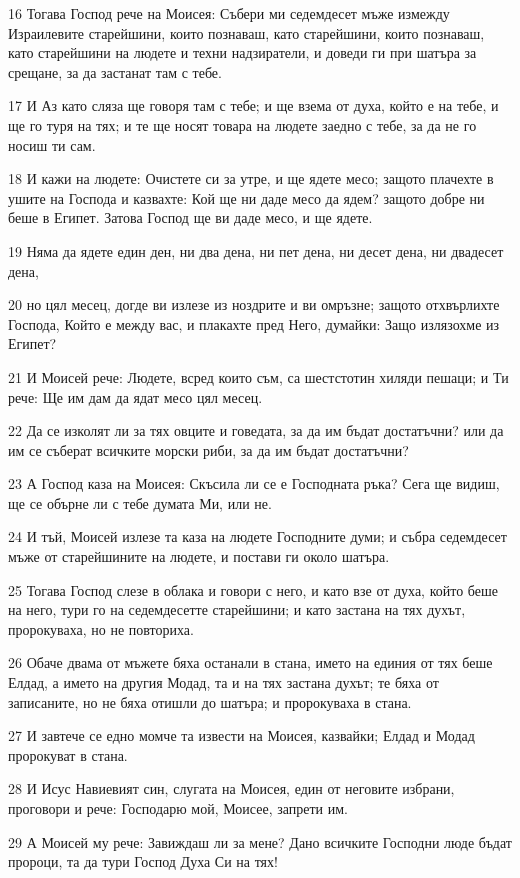 \par 16 Тогава Господ рече на Моисея: Събери ми седемдесет мъже измежду Израилевите старейшини, които познаваш, като старейшини, които познаваш, като старейшини на людете и техни надзиратели, и доведи ги при шатъра за срещане, за да застанат там с тебе.
\par 17 И Аз като сляза ще говоря там с тебе; и ще взема от духа, който е на тебе, и ще го туря на тях; и те ще носят товара на людете заедно с тебе, за да не го носиш ти сам.
\par 18 И кажи на людете: Очистете си за утре, и ще ядете месо; защото плачехте в ушите на Господа и казвахте: Кой ще ни даде месо да ядем? защото добре ни беше в Египет. Затова Господ ще ви даде месо, и ще ядете.
\par 19 Няма да ядете един ден, ни два дена, ни пет дена, ни десет дена, ни двадесет дена,
\par 20 но цял месец, догде ви излезе из ноздрите и ви омръзне; защото отхвърлихте Господа, Който е между вас, и плакахте пред Него, думайки: Защо излязохме из Египет?
\par 21 И Моисей рече: Людете, всред които съм, са шестстотин хиляди пешаци; и Ти рече: Ще им дам да ядат месо цял месец.
\par 22 Да се изколят ли за тях овците и говедата, за да им бъдат достатъчни? или да им се съберат всичките морски риби, за да им бъдат достатъчни?
\par 23 А Господ каза на Моисея: Скъсила ли се е Господната ръка? Сега ще видиш, ще се обърне ли с тебе думата Ми, или не.
\par 24 И тъй, Моисей излезе та каза на людете Господните думи; и събра седемдесет мъже от старейшините на людете, и постави ги около шатъра.
\par 25 Тогава Господ слезе в облака и говори с него, и като взе от духа, който беше на него, тури го на седемдесетте старейшини; и като застана на тях духът, пророкуваха, но не повториха.
\par 26 Обаче двама от мъжете бяха останали в стана, името на единия от тях беше Елдад, а името на другия Модад, та и на тях застана духът; те бяха от записаните, но не бяха отишли до шатъра; и пророкуваха в стана.
\par 27 И завтече се едно момче та извести на Моисея, казвайки; Елдад и Модад пророкуват в стана.
\par 28 И Исус Навиевият син, слугата на Моисея, един от неговите избрани, проговори и рече: Господарю мой, Моисее, запрети им.
\par 29 А Моисей му рече: Завиждаш ли за мене? Дано всичките Господни люде бъдат пророци, та да тури Господ Духа Си на тях!
